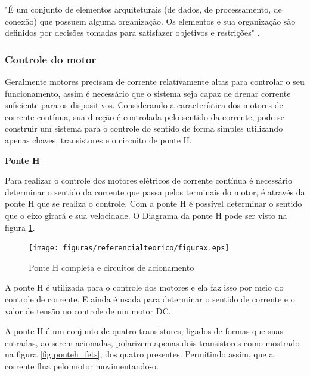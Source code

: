 "É um conjunto de elementos arquiteturais (de dados, de processamento, de conexão) que possuem alguma organização. Os elementos e sua organização são definidos por decisões tomadas para satisfazer objetivos e restrições" \cite{arquitetura_definition}.

\subsubsection{Controle do motor}

Geralmente motores precisam de corrente relativamente altas para controlar o seu funcionamento, assim é necessário que o sistema seja capaz de drenar corrente suficiente para os dispositivos. Considerando a característica dos motores de corrente contínua, sua direção é controlada pelo sentido da corrente, pode-se construir um sistema para o controle do sentido de forma simples utilizando apenas chaves, transistores e o circuito de ponte H.

\textbf{Ponte H}

Para realizar o controle dos motores elétricos de corrente contínua é necessário determinar o sentido da corrente que passa pelos terminais do motor, é através da ponte H que se realiza o controle. Com a ponte H é possível determinar o sentido que o eixo girará e sua velocidade. O Diagrama da ponte H pode ser visto na figura \ref{fig:ponteh}.

\begin{figure}[!htb]
	\centering
	\texttt{[image: figuras/referencialteorico/figurax.eps]}
	\caption{Ponte H completa e circuitos de acionamento}
	\label{fig:ponteh}
\end{figure}

A ponte H é utilizada para o controle dos motores e ela faz isso por meio do controle de corrente. E ainda é usada para determinar o sentido de corrente e o valor de tensão no controle de um motor DC.

A ponte H é um conjunto de quatro transistores, ligados de formas que suas entradas, ao serem acionadas, polarizem apenas dois transistores como mostrado na figura \ref{fig:ponteh_fets}, dos quatro presentes. Permitindo assim, que a corrente flua pelo motor movimentando-o.

